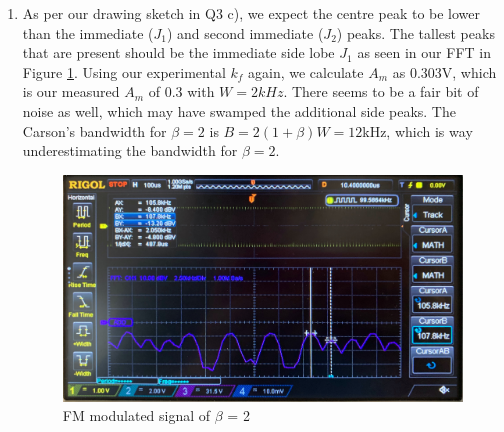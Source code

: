 \documentclass[11pt]{article}
\begin{document}
\begin{enumerate}[label=(\alph*)]
\begin{enumerate}
    \item %
    As per our drawing sketch in Q3 c), we expect the centre peak to be lower than the immediate ($J_1$) and second immediate ($J_2$) peaks. The tallest peaks that are present should be the immediate side lobe $J_1$ as seen in our FFT in Figure \ref{fig:W3Q4bB2}. Using our experimental $k_f$ again, we calculate $A_m$ as 0.303V, which is our measured $A_m$ of 0.3 with $W=2kHz$. There seems to be a fair bit of noise as well, which may have swamped the additional side peaks. 
    The Carson's bandwidth for $\beta = 2$ is $B = 2(1 + \beta)W = 12$kHz, which is way underestimating the bandwidth for $\beta=2$. 
    \begin{figure}[H]
    \centering
    \includegraphics[width=15cm]{W3Q4bB2.jpg}
    \caption{FM modulated signal of $\beta$ = 2}
    \label{fig:W3Q4bB2}
    \end{figure}
    

\end{enumerate}
\end{enumerate}
\end{document}

